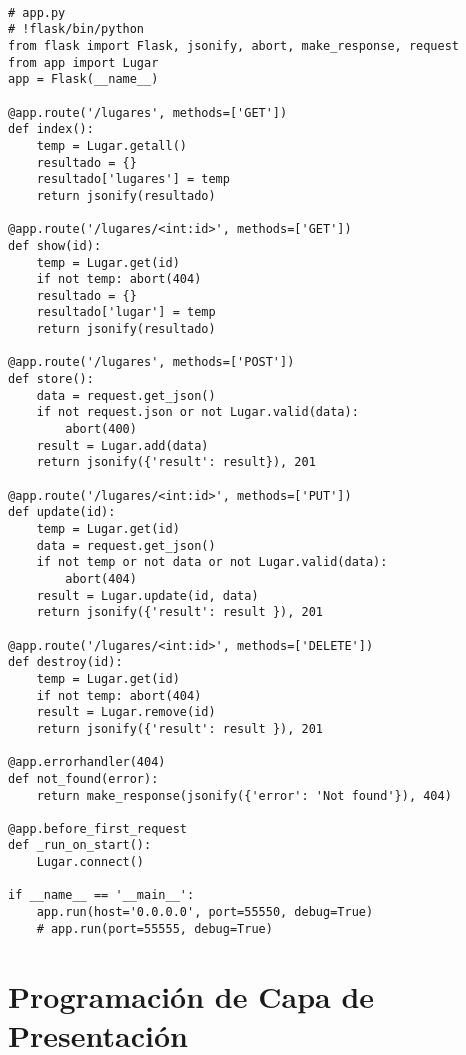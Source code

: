 \begin{verbatim}

# app.py
# !flask/bin/python
from flask import Flask, jsonify, abort, make_response, request
from app import Lugar
app = Flask(__name__)

@app.route('/lugares', methods=['GET'])
def index():
    temp = Lugar.getall()
    resultado = {}
    resultado['lugares'] = temp
    return jsonify(resultado)

@app.route('/lugares/<int:id>', methods=['GET'])
def show(id):
    temp = Lugar.get(id)
    if not temp: abort(404)
    resultado = {}
    resultado['lugar'] = temp
    return jsonify(resultado)

@app.route('/lugares', methods=['POST'])
def store():
    data = request.get_json()
    if not request.json or not Lugar.valid(data):
        abort(400)
    result = Lugar.add(data)
    return jsonify({'result': result}), 201

@app.route('/lugares/<int:id>', methods=['PUT'])
def update(id):
    temp = Lugar.get(id)
    data = request.get_json()
    if not temp or not data or not Lugar.valid(data):
        abort(404)
    result = Lugar.update(id, data)
    return jsonify({'result': result }), 201

@app.route('/lugares/<int:id>', methods=['DELETE'])
def destroy(id):
    temp = Lugar.get(id)
    if not temp: abort(404)
    result = Lugar.remove(id)
    return jsonify({'result': result }), 201

@app.errorhandler(404)
def not_found(error):
    return make_response(jsonify({'error': 'Not found'}), 404)

@app.before_first_request
def _run_on_start():
    Lugar.connect()

if __name__ == '__main__':
    app.run(host='0.0.0.0', port=55550, debug=True)
    # app.run(port=55555, debug=True)

\end{verbatim}



\section{Programación de Capa de Presentación}